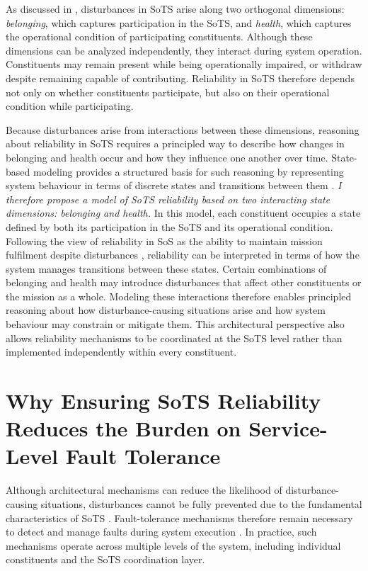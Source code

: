 As discussed in , disturbances in SoTS arise along two orthogonal dimensions: \emph{belonging}, which captures participation in the SoTS, and \emph{health}, which captures the operational condition of participating constituents. Although these dimensions can be analyzed independently, they interact during system operation. Constituents may remain present while being operationally impaired, or withdraw despite remaining capable of contributing. Reliability in SoTS therefore depends not only on whether constituents participate, but also on their operational condition while participating.

Because disturbances arise from interactions between these dimensions, reasoning about reliability in SoTS requires a principled way to describe how changes in belonging and health occur and how they influence one another over time. State-based modeling provides a structured basis for such reasoning by representing system behaviour in terms of discrete states and transitions between them \cite{liang2006comparative}. \emph{I therefore propose a model of SoTS reliability based on two interacting state dimensions: belonging and health.} In this model, each constituent occupies a state defined by both its participation in the SoTS and its operational condition. Following the view of reliability in SoS as the ability to maintain mission fulfilment despite disturbances \cite{ferreira2023towards}, reliability can be interpreted in terms of how the system manages transitions between these states. Certain combinations of belonging and health may introduce disturbances that affect other constituents or the mission as a whole. Modeling these interactions therefore enables principled reasoning about how disturbance-causing situations arise and how system behaviour may constrain or mitigate them. This architectural perspective also allows reliability mechanisms to be coordinated at the SoTS level rather than implemented independently within every constituent.

\section{Why Ensuring SoTS Reliability Reduces the Burden on Service-Level Fault Tolerance}
\label{sec:reducing-fault-tolerance-burden}

Although architectural mechanisms can reduce the likelihood of disturbance-causing situations, disturbances cannot be fully prevented due to the fundamental characteristics of SoTS \cite{nielsen2015systems,ferreira2023towards}. Fault-tolerance mechanisms therefore remain necessary to detect and manage faults during system execution \cite{hanmer2013patterns,avizienis2004basic}. In practice, such mechanisms operate across multiple levels of the system, including individual constituents and the SoTS coordination layer.

